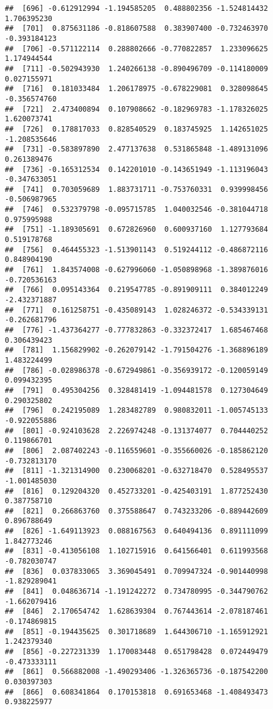 \documentclass[
]{article}
\begin{document}
\begin{verbatim}
##  [696] -0.612912994 -1.194585205  0.488802356 -1.524814432  1.706395230
##  [701]  0.875631186 -0.818607588  0.383907400 -0.732463970 -0.393184123
##  [706] -0.571122114  0.288802666 -0.770822857  1.233096625  1.174944544
##  [711] -0.502943930  1.240266138 -0.890496709 -0.114180009  0.027155971
##  [716]  0.181033484  1.206178975 -0.678229081  0.328098645 -0.356574760
##  [721]  2.473400894  0.107908662 -0.182969783 -1.178326025  1.620073741
##  [726]  0.178817033  0.828540529  0.183745925  1.142651025 -1.208535646
##  [731] -0.583897890  2.477137638  0.531865848 -1.489131096  0.261389476
##  [736] -0.165312534  0.142201010 -0.143651949 -1.113196043 -0.347633051
##  [741]  0.703059689  1.883731711 -0.753760331  0.939998456 -0.506987965
##  [746]  0.532379798 -0.095715785  1.040032546 -0.381044718  0.975995988
##  [751] -1.189305691  0.672826960  0.600937160  1.127793684  0.519178768
##  [756]  0.464455323 -1.513901143  0.519244112 -0.486872116  0.848904190
##  [761]  1.843574008 -0.627996060 -1.050898968 -1.389876016 -0.720536163
##  [766]  0.095143364  0.219547785 -0.891909111  0.384012249 -2.432371887
##  [771]  0.161258751 -0.435089143  1.028246372 -0.534339131 -0.262681796
##  [776] -1.437364277 -0.777832863 -0.332372417  1.685467468  0.306439423
##  [781]  1.156829902 -0.262079142 -1.791504276 -1.368896189  1.483224499
##  [786] -0.028986378 -0.672949861 -0.356939172 -0.120059149  0.099432395
##  [791]  0.495304256  0.328481419 -1.094481578  0.127304649  0.290325802
##  [796]  0.242195089  1.283482789  0.980832011 -1.005745133 -0.922055886
##  [801] -0.924103628  2.226974248 -0.131374077  0.704440252  0.119866701
##  [806]  2.087402243 -0.116559601 -0.355660026 -0.185862120 -0.732813170
##  [811] -1.321314900  0.230068201 -0.632718470  0.528495537 -1.001485030
##  [816]  0.129204320  0.452733201 -0.425403191  1.877252430  0.387758710
##  [821]  0.266863760  0.375588647  0.743233206 -0.889442609  0.896788649
##  [826] -1.649113923  0.088167563  0.640494136  0.891111099  1.842773246
##  [831] -0.413056108  1.102715916  0.641566401  0.611993568 -0.782030747
##  [836]  0.037833065  3.369045491  0.709947324 -0.901440998 -1.829289041
##  [841]  0.048636714 -1.191242272  0.734780995 -0.344790762 -1.662079416
##  [846]  2.170654742  1.628639304  0.767443614 -2.078187461 -0.174869815
##  [851] -0.194435625  0.301718689  1.644306710 -1.165912921  1.242379340
##  [856] -0.227231339  1.170083448  0.651798428  0.072449479 -0.473333111
##  [861]  0.566882008 -1.490293406 -1.326365736 -0.187542200  0.030397303
##  [866]  0.608341864  0.170153818  0.691653468 -1.408493473  0.938225977

\end{verbatim}
\end{document}
